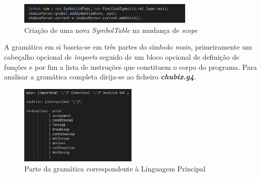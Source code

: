 \documentclass[10pt,portuguese]{article}
\begin{document}
\begin{figure}[h]
\centering
\includegraphics[width=0.75\textwidth]{images/unknown.png}
\caption{Criação de uma nova \textit{SymbolTable} na mudança de \textit{scope}}
\end{figure}
\par A gramática em si baseia-se em três partes do símbolo \emph{main}, primeiramente um cabeçalho opcional de \emph{imports} seguido de um bloco opcional de definição de funções e por fim a lista de instruções que constituem o corpo do programa. Para analisar a gramática completa dirija-se ao ficheiro \textbf{\textit{chubix.g4}}.

\clearpage

\begin{figure}[h]
\centering
\includegraphics[width=0.5\textwidth]{images/mainchubix.png}
\caption{Parte da gramática correspondente à Linguagem Principal}
\end{figure}
\end{document}
